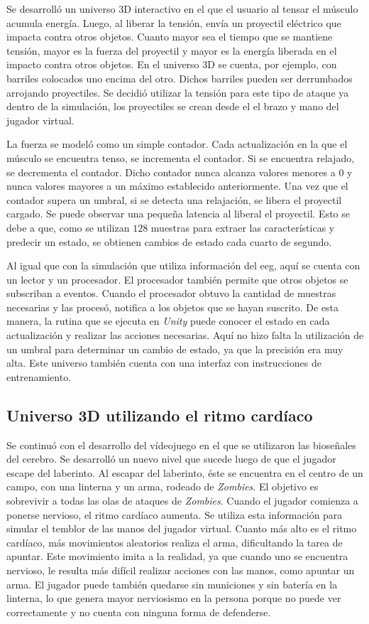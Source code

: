 Se desarrolló un universo 3D interactivo en el que el usuario al tensar el músculo acumula energía. Luego, al liberar la tensión, envía un proyectil eléctrico que impacta contra otros objetos. Cuanto mayor sea el tiempo que se mantiene tensión, mayor es la fuerza del proyectil y mayor es la energía liberada en el impacto contra otros objetos. En el universo 3D se cuenta, por ejemplo, con barriles colocados uno encima del otro. Dichos barriles pueden ser derrumbados arrojando proyectiles. Se decidió utilizar la tensión para este tipo de ataque ya dentro de la simulación, los proyectiles se crean desde el el brazo y mano del jugador virtual.

La fuerza se modeló como un simple contador. Cada actualización en la que el músculo se encuentra tenso, se incrementa el contador. Si se encuentra relajado, se decrementa el contador. Dicho contador nunca alcanza valores menores a $0$ y nunca valores mayores a un máximo establecido anteriormente. Una vez que el contador supera un umbral, si se detecta una relajación, se libera el proyectil cargado. Se puede observar una pequeña latencia al liberal el proyectil. Esto se debe a que, como se utilizan $128$ muestras para extraer las características y predecir un estado, se obtienen cambios de estado cada cuarto de segundo.

Al igual que con la simulación que utiliza información del \acrshort{eeg}, aquí se cuenta con un lector y un procesador. El procesador también permite que otros objetos se subscriban a eventos. Cuando el procesador obtuvo la cantidad de muestras necesarias y las procesó, notifica a los objetos que se hayan suscrito. De esta manera, la rutina que se ejecuta en \emph{Unity} puede conocer el estado en cada actualización y realizar las acciones necesarias. Aquí no hizo falta la utilización de un umbral para determinar un cambio de estado, ya que la precisión era muy alta. Este universo también cuenta con una interfaz con instrucciones de entrenamiento.

\subsection{Universo 3D utilizando el ritmo cardíaco}

Se continuó con el desarrollo del vídeojuego en el que se utilizaron las bioseñales del cerebro. Se desarrolló un nuevo nivel que sucede luego de que el jugador escape del laberinto. Al escapar del laberinto, éste se encuentra en el centro de un campo,  con una linterna y un arma, rodeado de \emph{Zombies}. El objetivo es sobrevivir a todas las olas de ataques de \emph{Zombies}. Cuando el jugador comienza a ponerse nervioso, el ritmo cardíaco aumenta. Se utiliza esta información para simular el temblor de las manos del jugador virtual. Cuanto más alto es el ritmo cardíaco, más movimientos aleatorios realiza el arma, dificultando la tarea de apuntar. Este movimiento imita a la realidad, ya que cuando uno se encuentra nervioso, le resulta más difícil realizar acciones con las manos, como apuntar un arma. El jugador puede también quedarse sin municiones y sin batería en la linterna, lo que genera mayor nerviosismo en la persona porque no puede ver correctamente y no cuenta con ninguna forma de defenderse.

